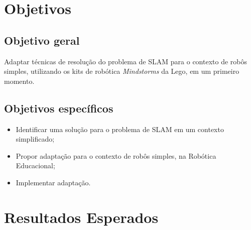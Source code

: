 	\section{Objetivos}

	\subsection{Objetivo geral} %
	\label{sub:objetivos_gerais}
	
		Adaptar técnicas de resolução do problema de SLAM para o contexto de robôs simples, utilizando os kits de robótica \textit{Mindstorms} da Lego, em um primeiro momento.


	\subsection{Objetivos específicos} %
	\label{sub:objetivos_específicos}
		 
	\begin{itemize}
		\item Identificar uma solução para o problema de SLAM em um contexto simplificado;
		\item Propor adaptação para o contexto de robôs simples, na Robótica Educacional;
		\item Implementar adaptação.
	\end{itemize}
	



	\section{Resultados Esperados}

